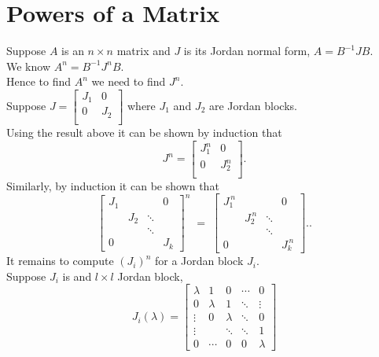 \documentclass{report}
\begin{document}
             \section{Powers of a Matrix}
 Suppose $ A$ is an $ n \times n$ matrix and $ J$ is its Jordan normal form, $ A = B ^{-1}J B$.\\
 We know $ A ^{n}= B ^{-1}J ^{n}B$.\\
 Hence to find $ A ^{n}$ we need to find $ J ^{n}$.\\
 Suppose $ J = \begin{bmatrix}
 J_1 & 0\\
 0 & J_2\\
 \end{bmatrix}$ where $ J_1$ and $ J_2$ are Jordan blocks.\\
 Using the result above it can be shown by induction that 
 \[
 J ^{n}= \begin{bmatrix}
 J_1 ^{n} & 0\\
 0 & J_2 ^{n}\\
 \end{bmatrix}
 .\] 
 Similarly, by induction it can be shown that
 \[
  \left[
\begin{array}{cccc}
J_{1} &        &        & 0 \\[2pt]
      & J_{2}  & \ddots &   \\[-2pt]
      &        & \ddots &   \\[2pt]
 0    &        &        & J_{k}
\end{array}
\right]^{\!n}
\;=\;
\left[
\begin{array}{cccc}
J_{1}^{\,n} &          &         & 0 \\[2pt]
            & J_{2}^{\,n} & \ddots  &   \\[-2pt]
            &            & \ddots  &   \\[2pt]
 0          &            &         & J_{k}^{\,n}
\end{array}
\right].
 .\] 
 It remains to compute $ \left( J_i \right) ^{n}$  for a Jordan block $ J_i$.\\
 Suppose $ J_i $ is and $ l \times  l$ Jordan block,
   \[
J_i(\lambda)=
\begin{bmatrix}
 \lambda & 1       & 0       & \cdots & 0 \\[2pt]
 0       & \lambda & 1       & \ddots & \vdots \\[2pt]
 \vdots  & 0       & \lambda & \ddots & 0 \\[2pt]
 \vdots  &         & \ddots  & \ddots & 1 \\[2pt]
 0       & \cdots  & 0       & 0      & \lambda
\end{bmatrix}
\]
\end{document}

